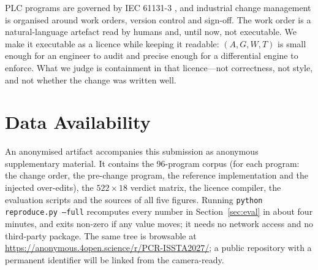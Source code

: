 \documentclass[acmsmall,screen,review,anonymous]{acmart}
\begin{document}
PLC programs are governed by IEC 61131-3 \citep{iec61131}, and industrial change management is organised around work orders, version control and sign-off. The work order is a natural-language artefact read by humans and, until now, not executable. We make it executable as a licence while keeping it readable: $(A,G,W,T)$ is small enough for an engineer to audit and precise enough for a differential engine to enforce. What we judge is containment in that licence---not correctness, not style, and not whether the change was written well.

\section*{Data Availability}\label{sec:data}

An anonymised artifact accompanies this submission as anonymous supplementary
material. It contains the 96-program corpus (for each program: the change
order, the pre-change program, the reference implementation and the injected
over-edits), the $522\times18$ verdict matrix, the licence compiler, the
evaluation scripts and the sources of all five figures. Running
\texttt{python reproduce.py --full} recomputes every number in
Section~\ref{sec:eval} in about four minutes, and exits non-zero if any value
moves; it needs no network access and no third-party package. The same tree is
browsable at \url{https://anonymous.4open.science/r/PCR-ISSTA2027/}; a public
repository with a permanent identifier will be linked from the camera-ready.



\end{document}
